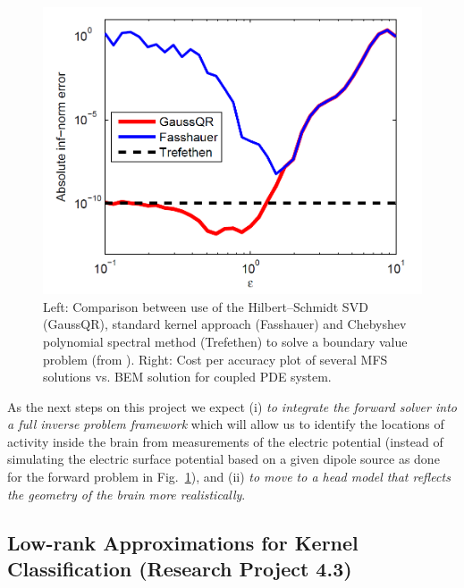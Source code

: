 \documentclass[11pt]{NSFamsart}
\begin{document}
\begin{figure}[h]
    \centering
    \includegraphics[width=.35\linewidth]{HSSVD_BVP}
\caption{Left: Comparison between use of the Hilbert--Schmidt SVD (GaussQR), standard kernel approach (Fasshauer) and Chebyshev polynomial spectral method (Trefethen) to solve a boundary value problem (from \citep{McCourt13}). Right: Cost per accuracy plot of several MFS solutions vs. BEM solution for coupled PDE system.}\label{Fig_MFS_BEM}
\end{figure}

As the next steps on this project we expect (i) \emph{to integrate the forward solver into a full inverse problem framework} which will allow us to identify the locations of activity inside the brain from measurements of the electric potential (instead of simulating the electric surface potential based on a given dipole source as done for the forward problem in Fig.~\ref{Fig_MFS_BEM}), and (ii) \emph{to move to a head model that reflects the geometry of the brain more realistically}.

\subsection{Low-rank Approximations for Kernel Classification (Research Project 4.3)}\label{Sec_TruncHS} 
\end{document}
